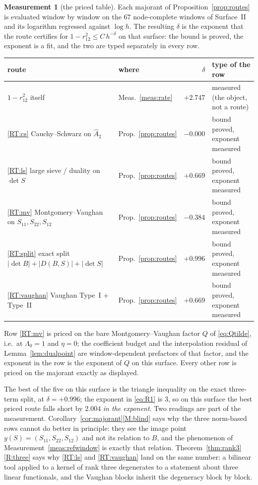 \documentclass[11pt,a4paper]{article}
\theoremstyle{plain}
\theoremstyle{definition}
\newtheorem{measurement}[theorem]{Measurement}
\newcommand{\Ah}{\widehat{A}}
\begin{document}
\begin{measurement}[the priced table]
\label{meas:routes}
Each majorant of Proposition~\ref{prop:routes} is evaluated window by window on
the $67$ node-complete windows of Surface~II and its logarithm regressed against
$\log h$. The resulting $\delta$ is the exponent that the route certifies for
$1-r_{12}^{2}\le C\,h^{-\delta}$ on that surface: the bound is proved, the
exponent is a fit, and the two are typed separately in every row.

\begin{center}\small
\begin{tabularx}{\textwidth}{@{}llrY@{}}
\toprule
route & where & $\delta$ & type of the row \\
\midrule
$1-r_{12}^{2}$ itself & Meas.~\ref{meas:rate}
  & $+2.747$ & measured (the object, not a route) \\
\ref{RT:cs} Cauchy--Schwarz on $\Ah_2$ & Prop.~\ref{prop:routes}
  & $-0.000$ & bound proved, exponent measured \\
\ref{RT:ls} large sieve / duality on $\det S$ & Prop.~\ref{prop:routes}
  & $+0.669$ & bound proved, exponent measured \\
\ref{RT:mv} Montgomery--Vaughan on $S_{11},S_{22},S_{12}$
  & Prop.~\ref{prop:routes}
  & $-0.384$ & bound proved, exponent measured \\
\ref{RT:split} exact split $|\det B|+|D(B,S)|+|\det S|$
  & Prop.~\ref{prop:routes}
  & $+0.996$ & bound proved, exponent measured \\
\ref{RT:vaughan} Vaughan Type~I $+$ Type~II & Prop.~\ref{prop:routes}
  & $+0.669$ & bound proved, exponent measured \\
\bottomrule
\end{tabularx}
\end{center}

\noindent
Row \ref{RT:mv} is priced on the bare Montgomery--Vaughan factor $Q$ of
\eqref{eq:Qtilde}, i.e.\ at $\Lambda_0=1$ and $\eta=0$; the coefficient budget
and the interpolation residual of Lemma~\ref{lem:dualpoint} are window-dependent
prefactors of that factor, and the exponent in the row is the exponent of $Q$ on
this surface. Every other row is priced on the majorant exactly as displayed.

The best of the five on this surface is the triangle inequality on the exact
three-term split, at $\delta=+0.996$; the exponent in \eqref{eq:R1} is $3$, so
on this surface the best priced route falls short by $2.004$ \emph{in the
exponent}. Two readings are part of the measurement.
Corollary~\ref{cor:majorant}\ref{M:blind} says why the three norm-based rows
cannot do better in principle: they see the image point
$y(S)=(S_{11},S_{22},S_{12})$ and not its relation to $B$, and the phenomenon
of Measurement~\ref{meas:refwindow} is exactly that relation.
Theorem~\ref{thm:rank3}\ref{R:three} says why \ref{RT:ls} and \ref{RT:vaughan}
land on the same number: a bilinear tool applied to a kernel of rank three
degenerates to a statement about three linear functionals, and the Vaughan
blocks inherit the degeneracy block by block.
\end{measurement}
\end{document}
